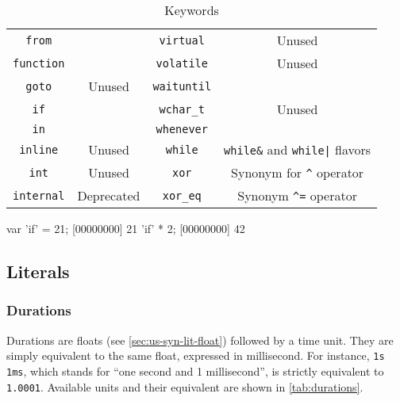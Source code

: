 \begin{table}[\floatpos]
\begin{tabular}{|c|c||c|c|}
    \lstinline"from"              &                                         &
    \lstinline"virtual"           & Unused                                  \\
    \lstinline"function"          &                                         &
    \lstinline"volatile"          & Unused                                  \\
    \lstinline"goto"              & Unused                                  &
    \lstinline"waituntil"         &                                         \\
    \lstinline"if"                &                                         &
    \lstinline"wchar_t"           & Unused                                  \\
    \lstinline"in"                &                                         &
    \lstinline"whenever"          &                                         \\
    \lstinline"inline"            & Unused                                  &
    \lstinline"while"             & \lstinline|while&| and
                                    \lstinline-while|- flavors              \\
    \lstinline"int"               & Unused                                  &
    \lstinline"xor"               & Synonym for \lstinline|^| operator      \\
    \lstinline"internal"          & Deprecated                              &
    \lstinline"xor_eq"            & Synonym \lstinline|^=| operator         \\
    \hline
  \end{tabular}
  \caption{Keywords}
  \label{tab:keywords}
\end{table}
\renewcommand{\baselinestretch}{1}

\begin{urbiscript}[caption=Escaping keywords,label=lst:escape-keyword,float=\floatpos]
  var 'if' = 21;
  [00000000] 21
  'if' * 2;
  [00000000] 42
\end{urbiscript}

\subsection{Literals}
\subsubsection{Durations}

Durations are floats (see \autoref{sec:us-syn-lit-float}) followed by a
time unit. They are simply equivalent to the same float, expressed in
millisecond. For instance, \lstinline|1s 1ms|, which stands for ``one
second and 1 millisecond'', is strictly equivalent to
\lstinline|1.0001|. Available units
and their equivalent are shown in \autoref{tab:durations}.

